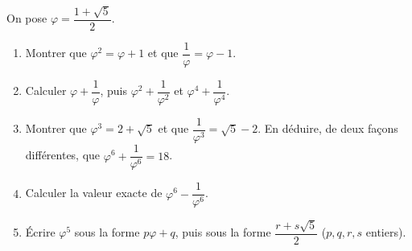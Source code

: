 
On pose $\varphi=\dfrac{1+\sqrt5}2$.
\begin{enumerate}
  \item Montrer que $\varphi^2=\varphi+1$ et que $\dfrac1\varphi=\varphi-1$.
  \item Calculer $\varphi+\dfrac1\varphi$, puis $\varphi^2+\dfrac1{\varphi^2}$ et $\varphi^4+\dfrac1{\varphi^4}$.
  \item Montrer que $\varphi^3=2+\sqrt5$ et que $\dfrac1{\varphi^3}=\sqrt5-2$. En déduire, de deux façons différentes, que $\varphi^6+\dfrac1{\varphi^6}=18$.
  \item Calculer la valeur exacte de $\varphi^6-\dfrac1{\varphi^6}$.
  \item Écrire $\varphi^5$ sous la forme $p\varphi+q$, puis sous la forme $\dfrac{r+s\sqrt5}2$ ($p,q,r,s$ entiers).
\end{enumerate}

